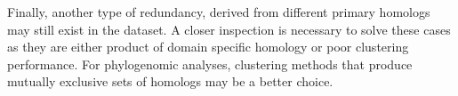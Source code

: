 \documentclass[10pt]{article}
\begin{document}
Finally, another type of redundancy, derived from different primary homologs may still exist in the dataset. A closer inspection is necessary to solve these cases as they are either product of domain specific homology or poor clustering performance. For phylogenomic analyses, clustering methods that produce mutually exclusive sets of homologs may be a better choice. 



\end{document}
